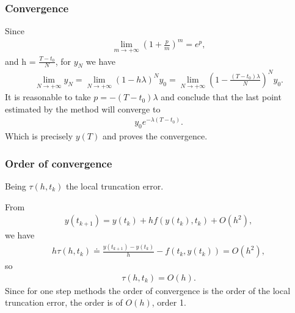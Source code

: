 \documentclass[letterpaper,10pt,english]{jupyterBook}
\begin{document}
\subsubsection{Convergence}
\label{\detokenize{cap2:convergence}}
\sphinxAtStartPar
Since
\begin{equation*}
\begin{split}
\lim_{m \to +\infty} \left(1 + \frac{p}{m} \right)^m = e^p,
\end{split}
\end{equation*}
\sphinxAtStartPar
and h = \(\frac{T-t_0}{N}\), for \(y_N\) we have
\begin{equation*}
\begin{split}
\lim_{N \to +\infty} y_N = \lim_{N \to +\infty} \left(1 - h \lambda \right)^N y_0 = \lim_{N \to +\infty} \left(1 - \frac{(T-t_0) \lambda}{N} \right)^N y_0.
\end{split}
\end{equation*}
\sphinxAtStartPar
It is reasonable to take \(p = -(T-t_0) \lambda\) and conclude that the last point estimated by the method will converge to
\begin{equation*}
\begin{split}
y_0e^{-\lambda (T-t_0)}.
\end{split}
\end{equation*}
\sphinxAtStartPar
Which is precisely \(y(T)\) and proves the convergence.


\subsubsection{Order of convergence}
\label{\detokenize{cap2:order-of-convergence}}
\sphinxAtStartPar
Being \(\tau(h, t_k)\) the local truncation error.

\sphinxAtStartPar
From
\begin{equation*}
\begin{split}
    y(t_{k+1}) = y(t_k) + h f(y(t_k),t_k) + O(h^2),
\end{split}
\end{equation*}
\sphinxAtStartPar
we have
\begin{equation*}
\begin{split}
    h \tau(h, t_k) \doteq \frac{y(t_{k+1}) - y(t_k)}{h} - f(t_k, y(t_k)) = O(h^2),
\end{split}
\end{equation*}
\sphinxAtStartPar
so
\begin{equation*}
\begin{split}
    \tau(h, t_k) = O(h).
\end{split}
\end{equation*}
\sphinxAtStartPar
Since for one step methods the order of convergence is the order of the local truncation error, the order is of \(O(h)\), order 1.
\end{document}
